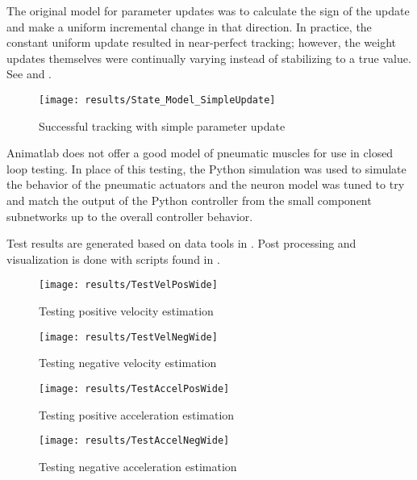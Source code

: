 
The original model for parameter updates was to calculate the sign of the update
and make a uniform incremental change in that direction. In practice, the constant uniform update
resulted in near-perfect tracking; however, the weight updates themselves were continually varying instead of stabilizing to a true value. See  and .

\begin{figure}
\centering
\texttt{[image: results/State\_Model\_SimpleUpdate]}
\caption{Successful tracking with simple parameter update}
\label{fig:StateUpdateSimple}
\end{figure}


Animatlab does not offer a good model of pneumatic muscles for use in closed loop testing. In place of this testing, the Python simulation was used to simulate the behavior of the pneumatic actuators and the neuron model was tuned to try and match the output of the Python controller from the small component subnetworks up to the overall controller behavior.


Test results are generated based on data tools in . Post processing and visualization is done with scripts found in .


\begin{figure}
\centering
\texttt{[image: results/TestVelPosWide]}
\caption{Testing positive velocity estimation}
\label{fig:TestVelPos}
\end{figure}

\begin{figure}
\centering
\texttt{[image: results/TestVelNegWide]}
\caption{Testing negative velocity estimation}
\label{fig:TestVelNeg}
\end{figure}

\begin{figure}
\centering
\texttt{[image: results/TestAccelPosWide]}
\caption{Testing positive acceleration estimation}
\label{fig:TestAccelPos}
\end{figure}

\begin{figure}
\centering
\texttt{[image: results/TestAccelNegWide]}
\caption{Testing negative acceleration estimation}
\label{fig:TestAccelNeg}
\end{figure}

